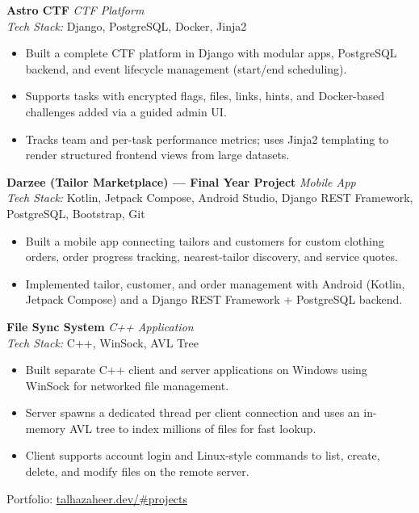 \documentclass[11pt,a4paper]{article}
\newcommand{\resumeItemList}{\begin{itemize}[leftmargin=*, nosep, topsep=2pt]}
\newcommand{\resumeItemListEnd}{\end{itemize}}
\begin{document}
\vspace{4pt}

\textbf{Astro CTF} \hfill \textit{CTF Platform} \\
\textit{Tech Stack:} Django, PostgreSQL, Docker, Jinja2
\resumeItemList
  \item Built a complete CTF platform in Django with modular apps, PostgreSQL backend, and event lifecycle management (start/end scheduling).
  \item Supports tasks with encrypted flags, files, links, hints, and Docker-based challenges added via a guided admin UI.
  \item Tracks team and per-task performance metrics; uses Jinja2 templating to render structured frontend views from large datasets.
\resumeItemListEnd

\vspace{4pt}

\textbf{Darzee (Tailor Marketplace) --- Final Year Project} \hfill \textit{Mobile App} \\
\textit{Tech Stack:} Kotlin, Jetpack Compose, Android Studio, Django REST Framework, PostgreSQL, Bootstrap, Git
\resumeItemList
  \item Built a mobile app connecting tailors and customers for custom clothing orders, order progress tracking, nearest-tailor discovery, and service quotes.
  \item Implemented tailor, customer, and order management with Android (Kotlin, Jetpack Compose) and a Django REST Framework + PostgreSQL backend.
\resumeItemListEnd

\vspace{4pt}

\textbf{File Sync System} \hfill \textit{C++ Application} \\
\textit{Tech Stack:} C++, WinSock, AVL Tree
\resumeItemList
  \item Built separate C++ client and server applications on Windows using WinSock for networked file management.
  \item Server spawns a dedicated thread per client connection and uses an in-memory AVL tree to index millions of files for fast lookup.
  \item Client supports account login and Linux-style commands to list, create, delete, and modify files on the remote server.
\resumeItemListEnd

\vspace{2pt}

{\small Portfolio: \href{https://talhazaheer.dev/\#projects}{talhazaheer.dev/\#projects}}
\end{document}
